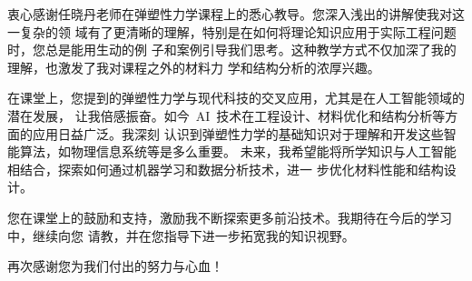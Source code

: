 衷心感谢任晓丹老师在弹塑性力学课程上的悉心教导。您深入浅出的讲解使我对这一复杂的领
域有了更清晰的理解，特别是在如何将理论知识应用于实际工程问题时，您总是能用生动的例
子和案例引导我们思考。这种教学方式不仅加深了我的理解，也激发了我对课程之外的材料力
学和结构分析的浓厚兴趣。

在课堂上，您提到的弹塑性力学与现代科技的交叉应用，尤其是在人工智能领域的潜在发展，
让我倍感振奋。如今~AI~技术在工程设计、材料优化和结构分析等方面的应用日益广泛。我深刻
认识到弹塑性力学的基础知识对于理解和开发这些智能算法，如物理信息系统等是多么重要。
未来，我希望能将所学知识与人工智能相结合，探索如何通过机器学习和数据分析技术，进一
步优化材料性能和结构设计。

您在课堂上的鼓励和支持，激励我不断探索更多前沿技术。我期待在今后的学习中，继续向您
请教，并在您指导下进一步拓宽我的知识视野。

再次感谢您为我们付出的努力与心血！